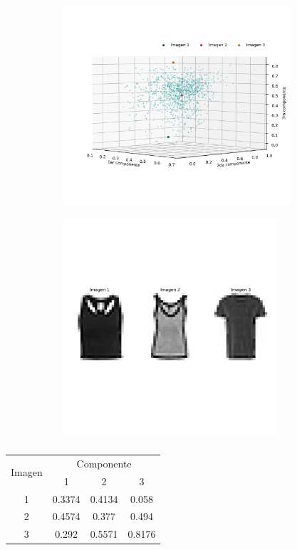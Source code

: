 \begin{figure}[H]
    \centering
    \begin{subfigure}{8.5cm}
        \includegraphics[width=8.5cm]{Graphics/Problema_3_1/loadings_3d.png}
        \caption{}
    \end{subfigure}
    \begin{subfigure}{8cm}
        \includegraphics[width=8cm]{Graphics/Problema_3_1/T_shirts_3d.png}
        \caption{}
    \end{subfigure}
    \caption{}
\end{figure}

\begin{table}[H]
    \centering
    \begin{tabular}{cccc} \hline
        \multirow{2}{*}{Imagen} & \multicolumn{3}{c}{Componente}                   \\
                                & 1                              & 2      & 3      \\ \hline
        1                       & 0.3374                         & 0.4134 & 0.058  \\
        2                       & 0.4574                         & 0.377  & 0.494  \\
        3                       & 0.292                          & 0.5571 & 0.8176 \\ \hline
    \end{tabular}
    \caption{}
\end{table}